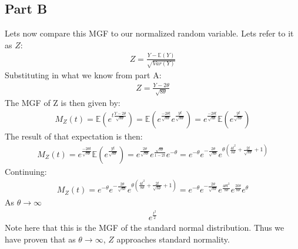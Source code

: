 \documentclass{article}
\begin{document}
\subsection*{Part B}
Lets now compare this MGF to our normalized random variable. Lets refer to it as $Z$:
\begin{align*}
Z = \frac{Y-\mathbb{E}(Y)}{\sqrt{Var(Y)}}
\end{align*}
Substituting in what we know from part A:
\begin{align*}
Z = \frac{Y-2\theta}{\sqrt{8\theta}}
\end{align*}
The MGF of Z is then given by:
\begin{align*}
M_Z(t) = \mathbb{E}(e^{t\tfrac{Y-2\theta}{\sqrt{8\theta}}}) = \mathbb{E}(e^{\tfrac{-2\theta t}{\sqrt{8\theta}}} e^{\tfrac{y t}{\sqrt{8\theta}}}) = e^{\tfrac{-2\theta t}{\sqrt{8\theta}}}\mathbb{E}(e^{\tfrac{y t}{\sqrt{8\theta}}})
\end{align*}
The result of that expectation is then:
\begin{align*}
M_Z(t) = e^{\tfrac{-2\theta t}{\sqrt{8\theta}}}\mathbb{E}(e^{\tfrac{y t}{\sqrt{8\theta}}}) = e^{\tfrac{2\theta}{\sqrt{8\theta}}} e^{\tfrac{\sqrt{8\theta}}{1-2t}} e^{-\theta} = e^{-\theta} e^{-\tfrac{2\theta}{\sqrt{8\theta}}} e^{\theta(\frac{4t^2}{8\theta}+\frac{2t}{\sqrt{8\theta}}+1)}
\end{align*}
Continuing:
\begin{align*}
M_Z(t) = e^{-\theta} e^{-\tfrac{2\theta}{\sqrt{8\theta}}} e^{\theta(\frac{4t^2}{8\theta}+\frac{2t}{\sqrt{8\theta}}+1)} = e^{-\theta} e^{-\tfrac{2\theta}{\sqrt{8\theta}}} e^{\tfrac{4\theta t^2}{8\theta}} e^{\tfrac{2t\theta}{8\theta}} e^{\theta}
\end{align*}
As $\theta \rightarrow \infty$
\begin{align*}
e^{\frac{t^2}{2}}
\end{align*}
Note here that this is the MGF of the standard normal distribution. Thus we have proven that as $\theta \rightarrow \infty$, $Z$ approaches standard normality.

\clearpage
\end{document}
